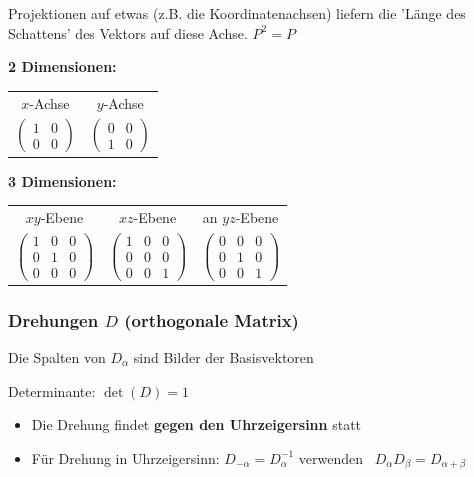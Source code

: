 Projektionen auf etwas (z.B. die Koordinatenachsen) liefern die 'Länge des Schattens' des Vektors auf diese Achse. \qquad $P^2 = P$ 
\vspace{0.2cm}

\textbf{2 Dimensionen:}
\vspace{0.2cm}
\begin{tabular}{cc}
	$x$-Achse & $y$-Achse \\
	$\begin{pmatrix} 1 & 0  \\ 0 & 0  \end{pmatrix}$ & $\begin{pmatrix} 0 & 0  \\ 1 & 0  \end{pmatrix}$
\end{tabular}				
	
\vspace{0.2cm}

\textbf{3 Dimensionen:}
\vspace{0.2cm}
\begin{tabular}{ccc}
	$xy$-Ebene & $xz$-Ebene & an $yz$-Ebene\\
	$\begin{pmatrix} 1 & 0 & 0 \\ 0 & 1 & 0 \\ 0 & 0 & 0 \end{pmatrix}$ & $\begin{pmatrix} 1 & 0 & 0 \\ 0 & 0 & 0 \\ 0 & 0 & 1 \end{pmatrix}$ & $\begin{pmatrix} 0 & 0 & 0 \\ 0 & 1 & 0 \\ 0 & 0 & 1 \end{pmatrix}$
\end{tabular}		  	
\vspace{0.2cm}


\subsubsection{Drehungen $D$ (orthogonale Matrix)}

Die Spalten von $D_{\alpha}$ sind Bilder der Basisvektoren 

Determinante: \quad $\det(D) = 1$

\vspace{0.2cm}
\begin{itemize}
	\item Die Drehung findet \textbf{gegen den Uhrzeigersinn} statt 
	\item Für Drehung in Uhrzeigersinn: $D_{-\alpha} = D_{\alpha}^{-1}$ verwenden \textrightarrow\ $D_{\alpha} D_{\beta} = D_{\alpha + \beta}$
\end{itemize}

